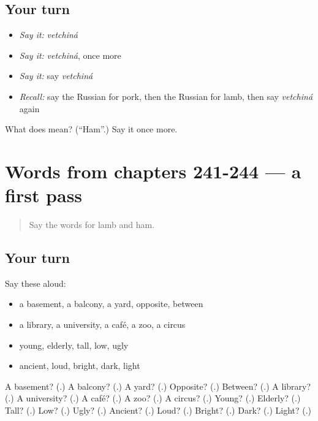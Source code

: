 \subsection*{Your turn}
\begin{itemize}
\raggedright
  \item \emph{Say it:} \emph{vetchiná}
  \item \emph{Say it:} \emph{vetchiná}, once more
  \item \emph{Say it:} say \emph{vetchiná}
  \item \emph{Recall:} say the Russian for pork, then the Russian for lamb, then say \emph{vetchiná} again
\end{itemize}

\begin{tcolorbox}[breakable,colback=teal!4,colframe=teal!35!black,title={Before you move on}]
What does  mean? (\textquotedblleft{}Ham\textquotedblright{}.) Say it once more.
\end{tcolorbox}
\section[(dialogue)]{Words from chapters 241-244 — a first pass}

\label{lesson:RU-R249-first-pass-words-from-chapters-241-244}



\begin{quote}
Say the words for lamb and ham.
\end{quote}

\subsection*{Your turn}
Say these aloud:

\begin{itemize}
\raggedright
  \item a basement, a balcony, a yard, opposite, between
  \item a library, a university, a café, a zoo, a circus
  \item young, elderly, tall, low, ugly
  \item ancient, loud, bright, dark, light
\end{itemize}

\begin{tcolorbox}[breakable,colback=teal!4,colframe=teal!35!black,title={Before you move on}]
A basement? (\textbf{}.) A balcony? (\textbf{}.) A yard? (\textbf{}.) Opposite? (\textbf{}.) Between? (\textbf{}.) A library? (\textbf{}.) A university? (\textbf{}.) A café? (\textbf{}.) A zoo? (\textbf{}.) A circus? (\textbf{}.) Young? (\textbf{}.) Elderly? (\textbf{}.) Tall? (\textbf{}.) Low? (\textbf{}.) Ugly? (\textbf{}.) Ancient? (\textbf{}.) Loud? (\textbf{}.) Bright? (\textbf{}.) Dark? (\textbf{}.) Light? (\textbf{}.)
\end{tcolorbox}

